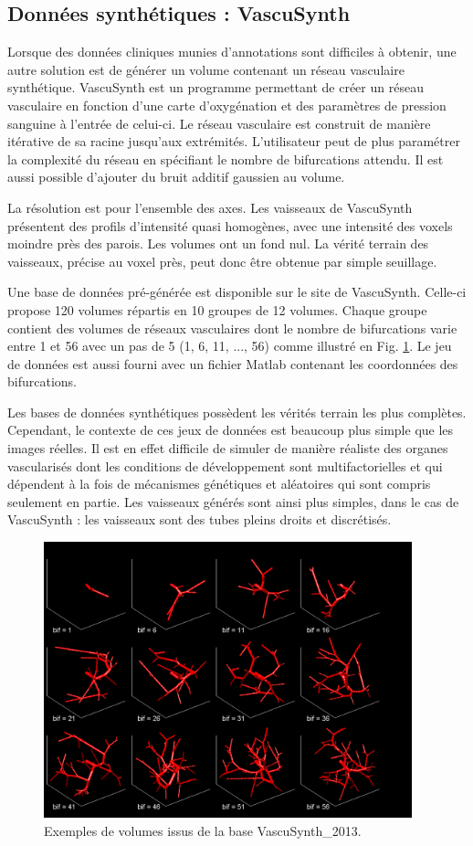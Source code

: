 \subsection{Données synthétiques : VascuSynth}
Lorsque des données cliniques munies d'annotations sont difficiles à obtenir, une autre solution est de générer un volume contenant un réseau vasculaire synthétique. VascuSynth est un programme permettant de créer un réseau vasculaire en fonction d'une carte d'oxygénation et des paramètres de pression sanguine à l'entrée de celui-ci. Le réseau vasculaire est construit de manière itérative de sa racine jusqu'aux extrémités. L'utilisateur peut de plus paramétrer la complexité du réseau en spécifiant le nombre de bifurcations attendu. Il est aussi possible d'ajouter du bruit additif gaussien au volume.

La résolution est  pour l'ensemble des axes. Les vaisseaux de VascuSynth présentent des profils d'intensité quasi homogènes, avec une intensité des voxels moindre près des parois. Les volumes ont un fond nul. La vérité terrain des vaisseaux, précise au voxel près, peut donc être obtenue par simple seuillage.

Une base de données pré-générée est disponible sur le site de VascuSynth. Celle-ci propose 120 volumes répartis en 10 groupes de 12 volumes. Chaque groupe contient des volumes de réseaux vasculaires dont le nombre de bifurcations varie entre 1 et 56 avec un pas de 5 (1, 6, 11, ..., 56) comme illustré en Fig. \ref{fig:VascuSynth}. Le jeu de données est aussi fourni avec un fichier Matlab contenant les coordonnées des bifurcations.

Les bases de données synthétiques possèdent les vérités terrain les plus complètes. Cependant, le contexte de ces jeux de données est beaucoup plus simple que les images réelles. Il est en effet difficile de simuler de manière réaliste des organes vascularisés dont les conditions de développement sont multifactorielles et qui dépendent à la fois de mécanismes génétiques et aléatoires qui sont compris seulement en partie. Les vaisseaux générés sont ainsi plus simples, dans le cas de VascuSynth : les vaisseaux sont des tubes pleins droits et discrétisés.
\begin{figure}
    \centering
    \includegraphics[height=8cm]{Images/snapVascu.png}
    \caption{Exemples de volumes issus de la base VascuSynth\_2013.}
    \label{fig:VascuSynth}
\end{figure}
